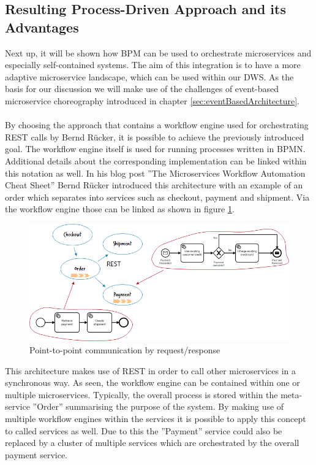 \subsection{Resulting Process-Driven Approach and its Advantages}
Next up, it will be shown how BPM can be used to orchestrate microservices and especially self-contained systems. The aim of this integration is to have a more adaptive microservice landscape, which can be used within our DWS. As the basis for our discussion we will make use of the challenges of event-based microservice choreography introduced in chapter \ref{sec:eventBasedArchitecture}.\newline
\\
\\
By choosing the approach that contains a workflow engine used for orchestrating REST calls by Bernd Rücker, it is possible to achieve the previously introduced goal. The workflow engine itself is used for running processes written in BPMN. Additional details about the corresponding implementation can be linked within this notation as well.\newline
In his blog post ''The Microservices Workflow Automation Cheat Sheet'' Bernd Rücker introduced this architecture with an example of an order which separates into services such as checkout, payment and shipment. Via the workflow engine those can be linked as shown in figure \ref{fig:RestArchitecture}. \cite{orchestrationMicroServices}\newline
\begin{figure}[!htb]
    \centering
    \includegraphics[scale=0.65]{pictures/RestArchitecture.png}
    \caption{Point-to-point communication by request/response \cite{orchestrationMicroServices}}
    \label{fig:RestArchitecture}
\end{figure}
This architecture makes use of REST in order to call other microservices in a synchronous way. As seen, the workflow engine can be contained within one or multiple microservices. \cite{orchestrationMicroServices} Typically, the overall process is stored within the meta-service ''Order'' summarising the purpose of the system. By making use of multiple workflow engines within the services it is possible to apply this concept to called services as well. Due to this the ''Payment'' service could also be replaced by a cluster of multiple services which are orchestrated by the overall payment service.\newline
